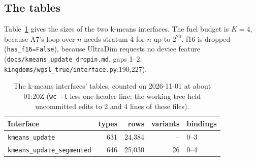 \documentclass[sigconf,nonacm]{acmart}
\newcommand{\code}[1]{\nolinkurl{#1}}
\newcommand{\src}[1]{{\footnotesize\nolinkurl{#1}}}
\begin{document}
\subsection{The tables}
Table~\ref{tab:tables} gives the sizes of the two k-means interfaces. The fuel
budget is $K=4$, because A7's loop over $n$ needs stratum 4 for $n$ up to
$2^{20}$. f16 is dropped (\code{has_f16=False}), because UltraDim requests no
device feature (\src{docs/kmeans_update_dropin.md}, gaps 1--2;
\src{kingdoms/wgsl_true/interface.py}:190,227).

\begin{table}[t]
\caption{The k-means interfaces' tables, counted on 2026-11-01 at about 01:20Z
(\code{wc -l} less one header line; the working tree held uncommitted edits to 2 and
4 lines of these files).}
\label{tab:tables}
\small
\begin{tabular}{@{}lrrrl@{}}
\toprule
Interface & types & rows & variants & bindings\\
\midrule
\code{kmeans_update} & 631 & 24,384 & -- & 0--3\\
\code{kmeans_update_segmented} & 646 & 25,030 & 26 & 0--4\\
\bottomrule
\end{tabular}
\end{table}
\end{document}
